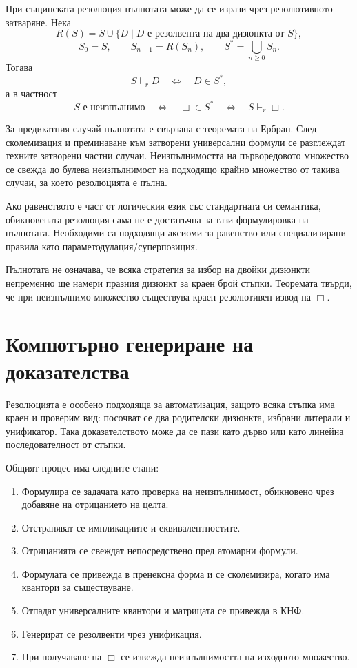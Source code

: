 При същинската резолюция пълнотата може да се изрази чрез резолютивното затваряне. Нека
\[
R(S)=S\cup
\{D\mid D\text{ е резолвента на два дизюнкта от }S\},
\]
\[
S_0=S,\qquad S_{n+1}=R(S_n),\qquad
S^*=\bigcup_{n\geq 0}S_n.
\]
Тогава
\[
S\vdash_rD
\quad\Longleftrightarrow\quad
D\in S^*,
\]
а в частност
\[
S\text{ е неизпълнимо}
\quad\Longleftrightarrow\quad
\Box\in S^*
\quad\Longleftrightarrow\quad
S\vdash_r\Box.
\]

За предикатния случай пълнотата е свързана с теоремата на Ербран. След сколемизация и преминаване към затворени универсални формули се разглеждат техните затворени частни случаи. Неизпълнимостта на първоредовото множество се свежда до булева неизпълнимост на подходящо крайно множество от такива случаи, за което резолюцията е пълна.

Ако равенството е част от логическия език със стандартната си семантика, обикновената резолюция сама не е достатъчна за тази формулировка на пълнотата. Необходими са подходящи аксиоми за равенство или специализирани правила като параметодулация/суперпозиция.

\begin{remark}
Пълнотата не означава, че всяка стратегия за избор на двойки дизюнкти непременно ще намери празния дизюнкт за краен брой стъпки. Теоремата твърди, че при неизпълнимо множество съществува краен резолютивен извод на $\Box$.
\end{remark}

\section{Компютърно генериране на доказателства}\label{s:22.4}

Резолюцията е особено подходяща за автоматизация, защото всяка стъпка има краен и проверим вид: посочват се два родителски дизюнкта, избрани литерали и унификатор. Така доказателството може да се пази като дърво или като линейна последователност от стъпки.

Общият процес има следните етапи:

\begin{enumerate}
\item Формулира се задачата като проверка на неизпълнимост, обикновено чрез добавяне на отрицанието на целта.
\item Отстраняват се импликациите и еквивалентностите.
\item Отрицанията се свеждат непосредствено пред атомарни формули.
\item Формулата се привежда в пренексна форма и се сколемизира, когато има квантори за съществуване.
\item Отпадат универсалните квантори и матрицата се привежда в КНФ.
\item Генерират се резолвенти чрез унификация.
\item При получаване на $\Box$ се извежда неизпълнимостта на изходното множество.
\end{enumerate}

